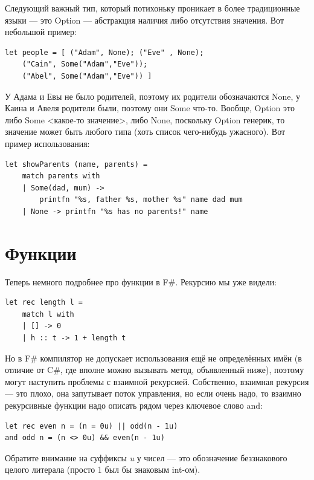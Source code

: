 \documentclass[a5paper]{article}
\begin{document}
Следующий важный тип, который потихоньку проникает в более традиционные языки --- это Option --- абстракция наличия либо отсутствия значения. Вот небольшой пример:

\begin{verbatim}
let people = [ ("Adam", None); ("Eve" , None);
    ("Cain", Some("Adam","Eve"));
    ("Abel", Some("Adam","Eve")) ]
\end{verbatim}

У Адама и Евы не было родителей, поэтому их родители обозначаются None, у Каина и Авеля родители были, поэтому они Some что-то. Вообще, Option это либо Some <какое-то значение>, либо None, поскольку Option генерик, то значение может быть любого типа (хоть список чего-нибудь ужасного). Вот пример использования:

\begin{verbatim}
let showParents (name, parents) =
    match parents with
    | Some(dad, mum) -> 
        printfn "%s, father %s, mother %s" name dad mum
    | None -> printfn "%s has no parents!" name
\end{verbatim}

\section{Функции}

Теперь немного подробнее про функции в F\#. Рекурсию мы уже видели:

\begin{verbatim}
let rec length l =
    match l with
    | [] -> 0
    | h :: t -> 1 + length t
\end{verbatim}

Но в F\# компилятор не допускает использования ещё не определённых имён (в отличие от C\#, где вполне можно вызывать метод, объявленный ниже), поэтому могут наступить проблемы с взаимной рекурсией. Собственно, взаимная рекурсия --- это плохо, она запутывает поток управления, но если очень надо, то взаимно рекурсивные функции надо описать рядом через ключевое слово and:

\begin{verbatim}
let rec even n = (n = 0u) || odd(n - 1u)
and odd n = (n <> 0u) && even(n - 1u)
\end{verbatim}

Обратите внимание на суффиксы \textit{u} у чисел --- это обозначение беззнакового целого литерала (просто 1 был бы знаковым int-ом).
\end{document}
